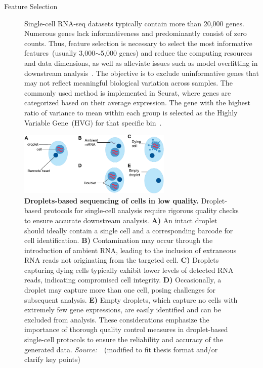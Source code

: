 \begin{description}
	\item[Feature Selection]
	Single-cell RNA-seq datasets typically contain more than 20,000 genes. Numerous genes lack informativeness and predominantly consist of zero counts. Thus, feature selection is necessary to select the most informative features~(usually 3,000$\sim$5,000 genes) and reduce the computing resources and data dimensions, as well as alleviate issues such as model overfitting in downstream analysis~\citep{yang2021feature}. The objective is to exclude uninformative genes that may not reflect meaningful biological variation across samples. The commonly used method is implemented in Seurat, where genes are categorized based on their average expression. The gene with the highest ratio of variance to mean within each group is selected as the Highly Variable Gene~(HVG) for that specific bin~\citep{stuart2019seurat3}.
\end{description}

\begin{figure}[!ht]
	\centering
	\includegraphics[width=0.65\textwidth]{QC_cells/fig}
	\vspace{0.1cm}
	\caption[Droplets-based sequencing of cells in low quality.]{\textbf{Droplets-based sequencing of cells in low quality.} Droplet-based protocols for single-cell analysis require rigorous quality checks to ensure accurate downstream analysis. \textbf{A)} An intact droplet should ideally contain a single cell and a corresponding barcode for cell identification. \textbf{B)} Contamination may occur through the introduction of ambient RNA, leading to the inclusion of extraneous RNA reads not originating from the targeted cell. \textbf{C)} Droplets capturing dying cells typically exhibit lower levels of detected RNA reads, indicating compromised cell integrity. \textbf{D)} Occasionally, a droplet may capture more than one cell, posing challenges for subsequent analysis. \textbf{E)} Empty droplets, which capture no cells with extremely few gene expressions, are easily identified and can be excluded from analysis. These considerations emphasize the importance of thorough quality control measures in droplet-based single-cell protocols to ensure the reliability and accuracy of the generated data. \emph{Source:~\cite{heumos2023best}}~(modified to fit thesis format and/or clarify key points)}
	\label{fig:QCcells}
\end{figure}
